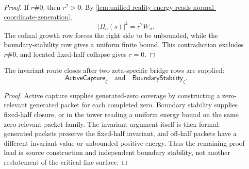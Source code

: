 \begin{proof}
If $r\#0$, then $r^2>0$.  By
\autoref{lem:unified-reality-energy-reads-normal-coordinate-generation},
$$
\left|\Omega_n(s)\right|^2=r^2W_n.
$$
The cofinal growth row forces the right side to be unbounded, while the
boundary-stability row gives a uniform finite bound.  This contradiction
excludes $r\#0$, and located fixed-half collapse gives $r=0$.
\end{proof}

\begin{corollary}
\label{cor:unified-reality-invariant-proof-load-two-bridge-rows}
The invariant route closes after two zeta-specific bridge rows are
supplied:
$$
\mathsf{ActiveCapture}_{\zeta}
\quad\text{and}\quad
\mathsf{BoundaryStability}_{\zeta}.
$$
\end{corollary}

\begin{proof}
Active capture supplies generated-zero coverage by constructing a
zero-relevant generated packet for each completed zero.  Boundary
stability supplies fixed-half closure, or in the tower reading a uniform
energy bound on the same zero-relevant packet family.  The invariant
argument itself is then formal: generated packets preserve the
fixed-half invariant, and off-half packets have a different invariant
value or unbounded positive energy.  Thus the remaining proof load is
source construction and independent boundary stability, not another
restatement of the critical-line surface.
\end{proof}

